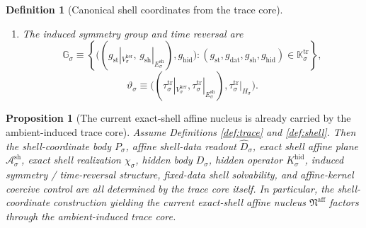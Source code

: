 \documentclass[11pt]{article}
\newcommand{\AffineNucleus}{\mathfrak N^{\mathrm{aff}}}
\newcommand{\GapSpace}[1]{H_{#1}}
\newcommand{\GapBody}[1]{D_{#1}}
\newcommand{\HiddenOperator}[1]{K_{#1}^{\mathrm{hid}}}
\newcommand{\TraceSym}[1]{\mathbb K_{#1}^{\mathrm{tr}}}
\newcommand{\TraceTime}[1]{\tau_{#1}^{\mathrm{tr}}}
\newcommand{\TraceEmbed}[1]{\zeta_{#1}}
\newcommand{\ShellKer}[1]{V_{#1}^{\mathrm{ker}}}
\newcommand{\ShellNormal}[1]{E_{#1}^{\mathrm{sh}}}
\newcommand{\ShellOffset}[1]{\lambda_{#1}^{\mathrm{sh}}}
\newcommand{\CoordSpace}[1]{\mathcal K_{#1}}
\newcommand{\CoordBody}[1]{P_{#1}}
\newcommand{\CoordIso}[1]{T_{#1}}
\newcommand{\AffineData}[1]{\widehat D_{#1}}
\newcommand{\ShellAffine}[1]{\mathcal A_{#1}^{\mathrm{sh}}}
\newcommand{\ShellEmbed}[1]{\chi_{#1}}
\newcommand{\SymGroup}[1]{\mathbb G_{#1}}
\newcommand{\TimeRev}[1]{\vartheta_{#1}}
\newtheorem{definition}{Definition}
\newtheorem{proposition}{Proposition}
\begin{document}
\begin{definition}[Canonical shell coordinates from the trace core]
\begin{enumerate}
\begin{equation}
    (v,e)\in\CoordSpace{\sigma}:
    e=\ShellOffset{\sigma}
    \right\},
    \label{eq:traceshellplane}
    \end{equation}
    and the exact shell realization is
    \begin{equation}
    \ShellEmbed{\sigma}(w)
    \equiv
    \CoordIso{\sigma}\bigl(\TraceEmbed{\sigma}(w)\bigr).
    \label{eq:traceshellembed}
    \end{equation}
    \item The induced symmetry group and time reversal are
    \[
    \SymGroup{\sigma}
    \equiv
    \left\{
    \bigl(
    (g_{\mathrm{st}}|_{\ShellKer{\sigma}},\,g_{\mathrm{sh}}|_{\ShellNormal{\sigma}}),
    g_{\mathrm{hid}}
    \bigr):
    (g_{\mathrm{st}},g_{\mathrm{dat}},g_{\mathrm{sh}},g_{\mathrm{hid}})
    \in\TraceSym{\sigma}
    \right\},
    \]
    \[
    \TimeRev{\sigma}
    \equiv
    \bigl(
    (\TraceTime{\sigma}|_{\ShellKer{\sigma}},
    \TraceTime{\sigma}|_{\ShellNormal{\sigma}}),
    \TraceTime{\sigma}|_{\GapSpace{\sigma}}
    \bigr).
    \]
\end{enumerate}
\end{definition}

\begin{proposition}[The current exact-shell affine nucleus is already carried by the ambient-induced trace core]
\label{prop:nucleus}
Assume Definitions \ref{def:trace} and \ref{def:shell}. Then the shell-coordinate body \(\CoordBody{\sigma}\), affine shell-data readout \(\AffineData{\sigma}\), exact shell affine plane \(\ShellAffine{\sigma}\), exact shell realization \(\ShellEmbed{\sigma}\), hidden body \(\GapBody{\sigma}\), hidden operator \(\HiddenOperator{\sigma}\), induced symmetry / time-reversal structure, fixed-data shell solvability, and affine-kernel coercive control are all determined by the trace core itself. In particular, the shell-coordinate construction yielding the current exact-shell affine nucleus \(\AffineNucleus\) factors through the ambient-induced trace core.
\end{proposition}
\end{document}
